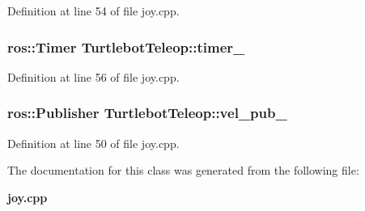 \-Definition at line 54 of file joy.\-cpp.

\subsubsection[{timer\-\_\-}]{\setlength{\rightskip}{0pt plus 5cm}ros\-::\-Timer {\bf \-Turtlebot\-Teleop\-::timer\-\_\-}\hspace{0.3cm}{\ttfamily  [private]}}\label{classTurtlebotTeleop_ac6f49f7a752545dfea96a6b2829bf0dc}


\-Definition at line 56 of file joy.\-cpp.

\subsubsection[{vel\-\_\-pub\-\_\-}]{\setlength{\rightskip}{0pt plus 5cm}ros\-::\-Publisher {\bf \-Turtlebot\-Teleop\-::vel\-\_\-pub\-\_\-}\hspace{0.3cm}{\ttfamily  [private]}}\label{classTurtlebotTeleop_a944ab5d8ea5a71817ac8d02ffdbc2188}


\-Definition at line 50 of file joy.\-cpp.



\-The documentation for this class was generated from the following file\-:\begin{DoxyCompactItemize}
\item 
{\bf joy.\-cpp}\end{DoxyCompactItemize}

